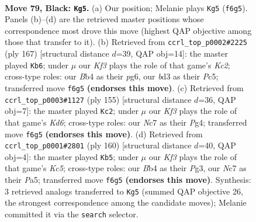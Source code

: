 \documentclass[11pt]{article}
\begin{document}
\clearpage

\begin{figure}[p]\centering
\begin{subfigure}{0.46\textwidth}\centering
\resizebox{\linewidth}{!}{%
\newchessgame
\chessboard[
  setfen={8/1Nn5/5kn1/p7/Pb1pP3/1P1B3p/4P3/2K5 b - - 25 79},
  showmover=false,
  pgfstyle=straightmove, color=movearrow, markmove={f6-g5}
]}
\caption{}
\end{subfigure}\hfill
\begin{subfigure}{0.46\textwidth}\centering
\resizebox{\linewidth}{!}{%
\newchessgame
\chessboard[
  setfen={8/2k3p1/5nPp/1Pp4P/2b5/2N1KB2/8/8 b - - 16 84},
  showmover=false,
  pgfstyle=straightmove, color=movearrow, markmove={c7-b6}
]}
\caption{}
\end{subfigure}
\\[4pt]
\begin{subfigure}{0.46\textwidth}\centering
\resizebox{\linewidth}{!}{%
\newchessgame
\chessboard[
  setfen={8/8/8/1K1pB3/p2P2p1/Pb1k4/1P5P/8 b - - 0 78},
  showmover=false,
  pgfstyle=straightmove, color=movearrow, markmove={d3-c2}
]}
\caption{}
\end{subfigure}\hfill
\begin{subfigure}{0.46\textwidth}\centering
\resizebox{\linewidth}{!}{%
\newchessgame
\chessboard[
  setfen={1B6/1p6/4k1p1/P1K1P2p/2p5/2Pb2P1/7P/8 w - - 49 81},
  showmover=false,
  pgfstyle=straightmove, color=movearrow, markmove={c5-b5}
]}
\caption{}
\end{subfigure}
\caption{\textbf{Move 79, Black: \texttt{Kg5}.} (a) Our position; Melanie plays \texttt{Kg5} (\texttt{f6g5}). Panels (b)--(d) are the retrieved master positions whose correspondence most drove this move (highest QAP objective among those that transfer to it). (b) Retrieved from \texttt{ccrl\_top\_p0002\#2225} (ply 167) [structural distance $d$=39, QAP obj=14]: the master played \texttt{Kb6}; under $\mu$ our \emph{Kf3} plays the role of that game's \emph{Kc2}; cross-type roles: our \emph{B}b4 as their \emph{p}g6, our \emph{b}d3 as their \emph{P}c5; transferred move \texttt{f6g5} \textbf{(endorses this move)}. (c) Retrieved from \texttt{ccrl\_top\_p0003\#1127} (ply 155) [structural distance $d$=36, QAP obj=7]: the master played \texttt{Kc2}; under $\mu$ our \emph{Kf3} plays the role of that game's \emph{Kd6}; cross-type roles: our \emph{N}c7 as their \emph{P}g4; transferred move \texttt{f6g5} \textbf{(endorses this move)}. (d) Retrieved from \texttt{ccrl\_top\_p0001\#2801} (ply 160) [structural distance $d$=40, QAP obj=4]: the master played \texttt{Kb5}; under $\mu$ our \emph{Kf3} plays the role of that game's \emph{Kc5}; cross-type roles: our \emph{B}b4 as their \emph{P}g3, our \emph{N}c7 as their \emph{P}a5; transferred move \texttt{f6g5} \textbf{(endorses this move)}. Synthesis: 3 retrieved analogs transferred to \texttt{Kg5} (summed QAP objective 26, the strongest correspondence among the candidate moves); Melanie committed it via the \texttt{search} selector.}
\label{fig:thought-m157}
\end{figure}
\end{document}
